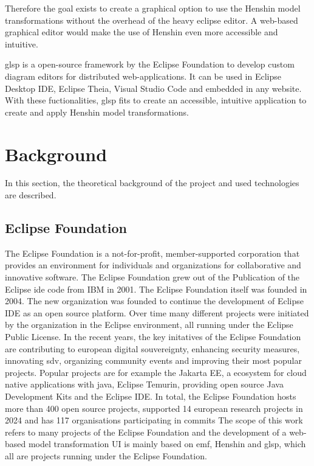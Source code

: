 \documentclass[conference,onecolumn]{IEEEtran}
\begin{document}
  Therefore the goal exists to create a graphical option to use the Henshin model transformations without the overhead of the heavy eclipse editor. A web-based graphical editor would make the use of Henshin even more accessible and intuitive.

  \ac{glsp} is a open-source framework by the Eclipse Foundation to develop custom diagram editors for distributed web-applications. \cite{glsp-repo} It can be used in Eclipse Desktop IDE, Eclipse Theia, Visual Studio Code and embedded in any website. With these fuctionalities, \ac{glsp} fits to create an accessible, intuitive application to create and apply Henshin model transformations.





  \section{Background}
  \label{sec:background}
  In this section, the theoretical background of the project and used technologies are described. 

  \subsection{Eclipse Foundation}
  \label{subsec:eclipse-foundation}
  The Eclipse Foundation is a not-for-profit, member-supported corporation that provides an environment for individuals and organizations for collaborative and innovative software. \cite{eclipse-review} The Eclipse Foundation grew out of the Publication of the Eclipse \ac{ide} code from IBM in 2001. The Eclipse Foundation itself was founded in 2004. The new organization was founded to continue the development of Eclipse IDE as an open source platform. Over time many different projects were initiated by the organization in the Eclipse environment, all running under the Eclipse Public License. \cite{heise-eclipse-foundation,eclipse-review} In the recent years, the key initatives of the Eclipse Foundation are contributing to european digital souvereignty, enhancing security measures, innovating \ac{sdv}, organizing community events and improving their most popular projects. Popular projects are for example the Jakarta EE, a ecosystem for cloud native applications with java, Eclipse Temurin, providing open source Java Development Kits and the Eclipse IDE. \cite{eclipse-report} In total, the Eclipse Foundation hosts more than 400 open source projects, supported 14 european research projects in 2024 and has 117 organisations participating in commits \cite{eclipse-report} The scope of this work refers to many projects of the Eclipse Foundation and the development of a web-based model transformation UI is mainly based on \ac{emf}, Henshin and \ac{glsp}, which all are projects running under the Eclipse Foundation.
\end{document}
